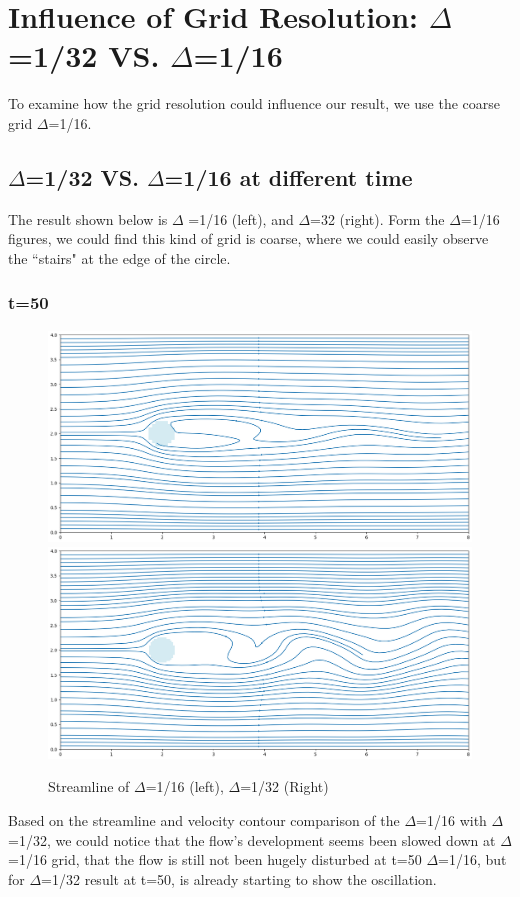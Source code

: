 \documentclass[12pt]{article}
\begin{document}
\section{Influence of Grid Resolution: $\Delta$=1/32 VS. $\Delta$=1/16}


To examine how the grid resolution could influence our result, we use the coarse grid $\Delta$=1/16. 


\subsection{$\Delta$=1/32 VS. $\Delta$=1/16 at different time }

The result shown below is $\Delta$ =1/16 (left), and $\Delta$=32 (right). Form the $\Delta$=1/16 figures, we could find this kind of grid is coarse, where we could easily observe the ``stairs" at the edge of the circle. 

\subsubsection{t=50}
\begin{figure}[H]
    \centering
    \includegraphics[width=0.45\linewidth]{figure/N16_Re150_8x4_t50/stline_N16_Re150_8x4_t50.jpg}
    \includegraphics[width=0.45\linewidth]{figure/N32_Re150_8x4_t50/stline_N32_Re150_8x4_t50.jpg}
    \caption{Streamline of $\Delta$=1/16 (left), $\Delta$=1/32 (Right) }
\end{figure}

Based on the streamline and velocity contour comparison of the $\Delta$=1/16 with $\Delta$=1/32, we could notice that the flow's development seems been slowed down at $\Delta$=1/16 grid, that the flow is still not been hugely disturbed at t=50 $\Delta$=1/16, but for $\Delta$=1/32 result at t=50, is already starting to show the oscillation.
\end{document}
